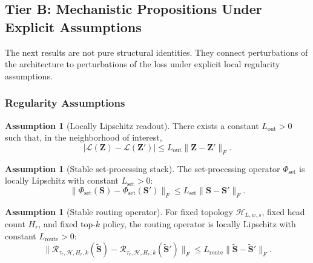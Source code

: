 \documentclass{article}
\theoremstyle{plain}
\theoremstyle{definition}
\newtheorem{assumption}[theorem]{Assumption}
\theoremstyle{remark}
\begin{document}
\subsection{Tier B: Mechanistic Propositions Under Explicit Assumptions}
\label{sec:tier-b}

The next results are not pure structural identities. They connect perturbations of the architecture to perturbations of the loss under explicit local regularity assumptions.

\subsubsection{Regularity Assumptions}
\label{sec:tier-b-assumptions}

\begin{assumption}[Locally Lipschitz readout]
\label{ass:lipschitz-readout}
There exists a constant $L_{\mathrm{out}}>0$ such that, in the neighborhood of interest,
\begin{equation}
\label{eq:lipschitz-readout-assumption}
|\mathcal{L}(\mathbf{Z})-\mathcal{L}(\mathbf{Z}')|
\le
L_{\mathrm{out}}\|\mathbf{Z}-\mathbf{Z}'\|_F.
\end{equation}
\end{assumption}

\begin{assumption}[Stable set-processing stack]
\label{ass:stable-set-stack}
The set-processing operator $\Phi_{\mathrm{set}}$ is locally Lipschitz with constant $L_{\mathrm{set}}>0$:
\begin{equation}
\label{eq:lipschitz-set-stack-assumption}
\|\Phi_{\mathrm{set}}(\mathbf{S})-\Phi_{\mathrm{set}}(\mathbf{S}')\|_F
\le
L_{\mathrm{set}}\|\mathbf{S}-\mathbf{S}'\|_F.
\end{equation}
\end{assumption}

\begin{assumption}[Stable routing operator]
\label{ass:stable-routing}
For fixed topology $\mathcal{H}_{L,w,s}$, fixed head count $H_r$, and fixed top-$k$ policy, the routing operator is locally Lipschitz with constant $L_{\mathrm{route}}>0$:
\begin{equation}
\label{eq:lipschitz-routing-assumption}
\|\mathcal{R}_{\tau_r,\mathcal{H},H_r,k}(\tilde{\mathbf{S}})
-
\mathcal{R}_{\tau_r,\mathcal{H},H_r,k}(\tilde{\mathbf{S}}')\|_F
\le
L_{\mathrm{route}}
\|\tilde{\mathbf{S}}-\tilde{\mathbf{S}}'\|_F.
\end{equation}
\end{assumption}
\end{document}
